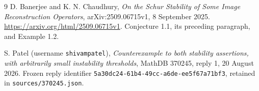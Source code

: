 \documentclass[11pt]{article}
\begin{document}
\begin{thebibliography}{9}
D. Banerjee and K. N. Chaudhury,
\emph{On the Schur Stability of Some Image Reconstruction Operators},
arXiv:2509.06715v1, 8 September 2025.
\url{https://arxiv.org/html/2509.06715v1}.
Conjecture 1.1, its preceding paragraph, and Example 1.2.

S. Patel (username \texttt{shivampatel}),
\emph{Counterexample to both stability assertions, with arbitrarily small
instability thresholds}, MathDB 370245, reply 1, 20 August 2026.
Frozen reply identifier
\texttt{5a30dc24-61b4-49cc-a6de-ee5f67a71bf3},
retained in \texttt{sources/370245.json}.
\end{thebibliography}
\end{document}
